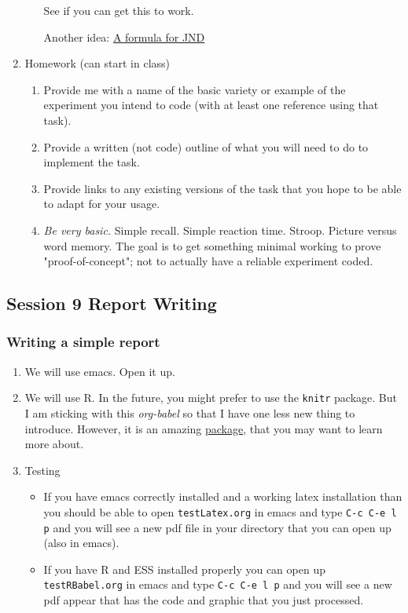 \documentclass{article}
\begin{document}
\begin{enumerate}
\begin{enumerate}
See if you can get this to work. 

Another idea: \href{https://www.psychopy.org/coder/tutorial2.html}{A formula for JND}
\end{enumerate}

\item Homework (can start in class)
\label{sec:org3942754}
\begin{enumerate}
\item Provide me with a name of the basic variety or example of the experiment you intend to code (with at least one reference using that task).
\item Provide a written (not code) outline of what you will need to do to implement the task.
\item Provide links to any existing versions of the task that you hope to be able to adapt for your usage.
\item \emph{Be very basic.} Simple recall. Simple reaction time. Stroop. Picture versus word memory. The goal is to get something minimal working to prove "proof-of-concept"; not to actually have a reliable experiment coded.
\end{enumerate}
\end{enumerate}
\subsection{Session 9 Report Writing}
\label{sec:org2d56ebd}
\subsubsection{Writing a simple report}
\label{sec:org32e8863}
\begin{enumerate}
\item We will use emacs. Open it up.
\item We will use R.
In the future, you might prefer to use the \texttt{knitr} package. But I am sticking with this \emph{org-babel} so that I have one less new thing to introduce. However, it is an amazing \href{https://yihui.name/knitr/}{package}, that you may want to learn more about.
\item Testing
\begin{itemize}
\item If you have emacs correctly installed and a working latex installation than you should be able to open \texttt{testLatex.org} in emacs and type \texttt{C-c C-e l p} and you will see a new pdf file in your directory that you can open up (also in emacs).
\item If you have R and ESS installed properly you can open up \texttt{testRBabel.org} in emacs and type \texttt{C-c C-e l p} and you will see a new pdf appear that has the code and graphic that you just processed.
\end{itemize}
\end{enumerate}
\end{document}
